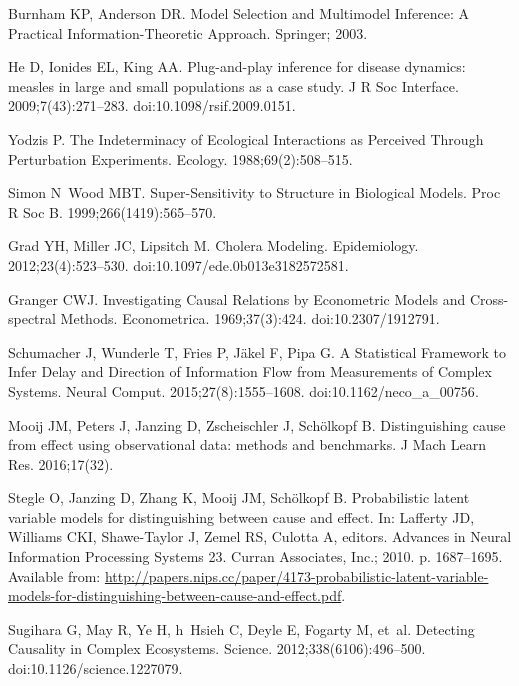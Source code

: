 \documentclass[10pt,letterpaper]{article}
\begin{document}
\begin{thebibliography}{10}
Burnham KP, Anderson DR.
\newblock Model Selection and Multimodel Inference: A Practical
  Information-Theoretic Approach.
\newblock Springer; 2003.

He D, Ionides EL, King AA.
\newblock Plug-and-play inference for disease dynamics: measles in large and
  small populations as a case study.
\newblock J R Soc Interface. 2009;7(43):271--283.
\newblock doi:{10.1098/rsif.2009.0151}.

Yodzis P.
\newblock The Indeterminacy of Ecological Interactions as Perceived Through
  Perturbation Experiments.
\newblock Ecology. 1988;69(2):508--515.

Simon N~Wood MBT.
\newblock Super-Sensitivity to Structure in Biological Models.
\newblock Proc R Soc B. 1999;266(1419):565--570.

Grad YH, Miller JC, Lipsitch M.
\newblock Cholera Modeling.
\newblock Epidemiology. 2012;23(4):523--530.
\newblock doi:{10.1097/ede.0b013e3182572581}.

Granger CWJ.
\newblock Investigating Causal Relations by Econometric Models and
  Cross-spectral Methods.
\newblock Econometrica. 1969;37(3):424.
\newblock doi:{10.2307/1912791}.

Schumacher J, Wunderle T, Fries P, J\"{a}kel F, Pipa G.
\newblock A Statistical Framework to Infer Delay and Direction of Information
  Flow from Measurements of Complex Systems.
\newblock Neural Comput. 2015;27(8):1555--1608.
\newblock doi:{10.1162/neco\_a\_00756}.

Mooij JM, Peters J, Janzing D, Zscheischler J, Sch{\"{o}}lkopf B.
\newblock Distinguishing cause from effect using observational data: methods
  and benchmarks.
\newblock J Mach Learn Res. 2016;17(32).

Stegle O, Janzing D, Zhang K, Mooij JM, Sch\"{o}lkopf B.
\newblock Probabilistic latent variable models for distinguishing between cause
  and effect.
\newblock In: Lafferty JD, Williams CKI, Shawe-Taylor J, Zemel RS, Culotta A,
  editors. Advances in Neural Information Processing Systems 23. Curran
  Associates, Inc.; 2010. p. 1687--1695.
\newblock Available from:
  \url{http://papers.nips.cc/paper/4173-probabilistic-latent-variable-models-for-distinguishing-between-cause-and-effect.pdf}.

Sugihara G, May R, Ye H, h~Hsieh C, Deyle E, Fogarty M, et~al.
\newblock Detecting Causality in Complex Ecosystems.
\newblock Science. 2012;338(6106):496--500.
\newblock doi:{10.1126/science.1227079}.


\end{thebibliography}
\end{document}
